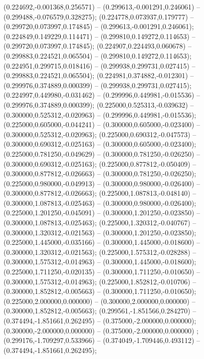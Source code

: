  (0.224692,-0.001368,0.256571) -- (0.299613,-0.001291,0.246061) -- (0.299488,-0.076579,0.328275);
 (0.224778,0.073937,0.179777) -- (0.299720,0.073997,0.174845) -- (0.299613,-0.001291,0.246061);
 (0.224849,0.149229,0.114471) -- (0.299810,0.149272,0.114653) -- (0.299720,0.073997,0.174845);
 (0.224907,0.224493,0.060678) -- (0.299883,0.224521,0.065504) -- (0.299810,0.149272,0.114653);
 (0.224951,0.299715,0.018416) -- (0.299938,0.299731,0.027415) -- (0.299883,0.224521,0.065504);
 (0.224981,0.374882,-0.012301) -- (0.299976,0.374889,0.000399) -- (0.299938,0.299731,0.027415);
 (0.224997,0.449980,-0.031462) -- (0.299996,0.449981,-0.015536) -- (0.299976,0.374889,0.000399);
 (0.225000,0.525313,-0.039632) -- (0.300000,0.525312,-0.020963) -- (0.299996,0.449981,-0.015536);
 (0.225000,0.605000,-0.044241) -- (0.300000,0.605000,-0.023400) -- (0.300000,0.525312,-0.020963);
 (0.225000,0.690312,-0.047573) -- (0.300000,0.690312,-0.025163) -- (0.300000,0.605000,-0.023400);
 (0.225000,0.781250,-0.049629) -- (0.300000,0.781250,-0.026250) -- (0.300000,0.690312,-0.025163);
 (0.225000,0.877812,-0.050409) -- (0.300000,0.877812,-0.026663) -- (0.300000,0.781250,-0.026250);
 (0.225000,0.980000,-0.049913) -- (0.300000,0.980000,-0.026400) -- (0.300000,0.877812,-0.026663);
 (0.225000,1.087813,-0.048140) -- (0.300000,1.087813,-0.025463) -- (0.300000,0.980000,-0.026400);
 (0.225000,1.201250,-0.045091) -- (0.300000,1.201250,-0.023850) -- (0.300000,1.087813,-0.025463);
 (0.225000,1.320312,-0.040767) -- (0.300000,1.320312,-0.021563) -- (0.300000,1.201250,-0.023850);
 (0.225000,1.445000,-0.035166) -- (0.300000,1.445000,-0.018600) -- (0.300000,1.320312,-0.021563);
 (0.225000,1.575312,-0.028288) -- (0.300000,1.575312,-0.014963) -- (0.300000,1.445000,-0.018600);
 (0.225000,1.711250,-0.020135) -- (0.300000,1.711250,-0.010650) -- (0.300000,1.575312,-0.014963);
 (0.225000,1.852812,-0.010706) -- (0.300000,1.852812,-0.005663) -- (0.300000,1.711250,-0.010650);
 (0.225000,2.000000,0.000000) -- (0.300000,2.000000,0.000000) -- (0.300000,1.852812,-0.005663);
 (0.299561,-1.851566,0.284270) -- (0.374494,-1.851661,0.262495) -- (0.375000,-2.000000,0.000000);
 (0.300000,-2.000000,0.000000) -- (0.375000,-2.000000,0.000000) ;
 (0.299176,-1.709297,0.533966) -- (0.374049,-1.709446,0.493112) -- (0.374494,-1.851661,0.262495);
